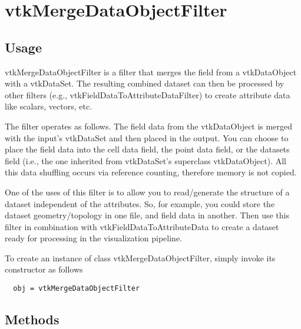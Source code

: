\section{vtkMergeDataObjectFilter}

\subsection{Usage}

 vtkMergeDataObjectFilter is a filter that merges the field from a
 vtkDataObject with a vtkDataSet. The resulting combined dataset can
 then be processed by other filters (e.g.,
 vtkFieldDataToAttributeDataFilter) to create attribute data like
 scalars, vectors, etc.

 The filter operates as follows. The field data from the
 vtkDataObject is merged with the input's vtkDataSet and then placed
 in the output. You can choose to place the field data into the cell
 data field, the point data field, or the datasets field (i.e., the
 one inherited from vtkDataSet's superclass vtkDataObject). All this
 data shuffling occurs via reference counting, therefore memory is
 not copied.

 One of the uses of this filter is to allow you to read/generate the
 structure of a dataset independent of the attributes. So, for
 example, you could store the dataset geometry/topology in one file,
 and field data in another. Then use this filter in combination with
 vtkFieldDataToAttributeData to create a dataset ready for
 processing in the visualization pipeline.

To create an instance of class vtkMergeDataObjectFilter, simply
invoke its constructor as follows
\begin{verbatim}
  obj = vtkMergeDataObjectFilter
\end{verbatim}
\subsection{Methods}


